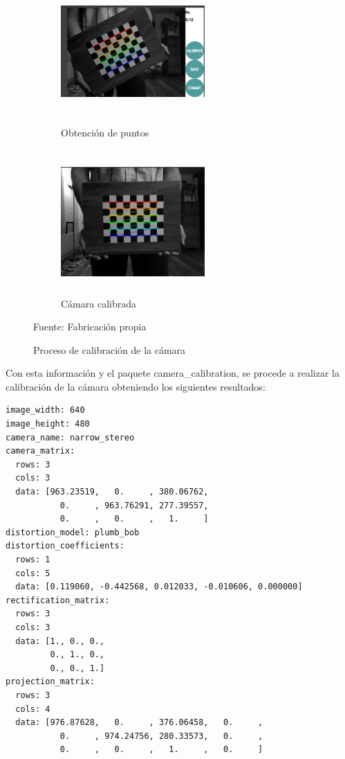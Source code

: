 \begin{figure}[H]
    \centering
    \begin{subfigure}[b]{0.45\textwidth}
    \includegraphics[width=5.5cm, height=5.5cm]{figures/05experimentacion/calibracion_1.png}
    \caption{Obtención de puntos}
    \label{fig:ambiente_1_1}
    \end{subfigure}
    \hspace{10mm}
    \begin{subfigure}[b]{0.45\textwidth}
    \includegraphics[width=5.5cm, height=5.5cm]{figures/05experimentacion/calibracion_2.png}
    \caption{Cámara calibrada}
    \label{fig:ambiente_1_2}
    \end{subfigure}
    \caption{Proceso de calibración de la cámara}
    Fuente: Fabricación propia
    \label{fig:ambiente_1}
\end{figure} 

Con esta información y el paquete camera\_calibration, se procede a realizar la calibración de la cámara obteniendo los siguientes resultados:
\begin{verbatim}
image_width: 640
image_height: 480
camera_name: narrow_stereo
camera_matrix:
  rows: 3
  cols: 3
  data: [963.23519,   0.     , 380.06762,
           0.     , 963.76291, 277.39557,
           0.     ,   0.     ,   1.     ]
distortion_model: plumb_bob
distortion_coefficients:
  rows: 1
  cols: 5
  data: [0.119060, -0.442568, 0.012033, -0.010606, 0.000000]
rectification_matrix:
  rows: 3
  cols: 3
  data: [1., 0., 0.,
         0., 1., 0.,
         0., 0., 1.]
projection_matrix:
  rows: 3
  cols: 4
  data: [976.87628,   0.     , 376.06458,   0.     ,
           0.     , 974.24756, 280.33573,   0.     ,
           0.     ,   0.     ,   1.     ,   0.     ]
\end{verbatim}

